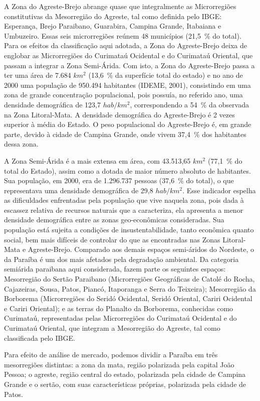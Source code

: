 A Zona do Agreste-Brejo abrange quase que integralmente as Microrregiões constitutivas da Mesorregião do Agreste, tal como definida pelo IBGE: Esperança, Brejo Paraibano, Guarabira, Campina Grande, Itabaiana e Umbuzeiro. Essas seis microrregiões reúnem 48 municípios (21,5~\% do total). Para os efeitos da classificação aqui adotada, a Zona do Agreste-Brejo deixa de englobar as Microrregiões do Curimataú Ocidental e do Curimataú Oriental, que passam a integrar a Zona Semi-Árida. Com isto, a Zona do Agreste-Brejo passa a ter uma área de 7.684 $km^2$ (13,6~\% da superfície total do estado) e no ano de 2000 uma população de 950.494 habitantes (IDEME, 2001), consistindo em uma zona de grande concentração populacional, pois possuía, no referido ano, uma densidade demográfica de 123,7 $hab/km^2$, correspondendo a 54~\% da observada na Zona Litoral-Mata. A densidade demográfica do Agreste-Brejo é 2 vezes superior à média do Estado. O peso populacional do Agreste-Brejo é, em grande parte, devido à cidade de Campina Grande, onde vivem 37,4~\% dos habitantes dessa zona.

A Zona Semi-Árida é a mais extensa em área, com 43.513,65 $km^2$ (77,1~\% do total do Estado), assim como a dotada de maior número absoluto de habitantes. Sua população, em 2000, era de 1.296.737 pessoas (37,6~\% do total), o que representava uma densidade demográfica de 29,8 $hab/km^2$. Esse indicador espelha as dificuldades enfrentadas pela população que vive naquela zona, pois dada à escassez relativa de recursos naturais que a caracteriza, ela apresenta a menor densidade demográfica entre as zonas geo-econômicas consideradas. Sua população está sujeita a condições de insustentabilidade, tanto econômica quanto social, bem mais difíceis de controlar do que as encontradas nas Zonas Litoral-Mata e Agreste-Brejo. Comparado aos demais espaços semi-áridos do Nordeste, o da Paraíba é um dos mais afetados pela degradação ambiental. Da categoria semiárida paraibana aqui considerada, fazem parte os seguintes espaços: Mesorregião do Sertão Paraibano (Microrregiões Geográficas de Catolé do Rocha, Cajazeiras, Sousa, Patos, Piancó, Itaporanga e Serra do Teixeira); Mesorregião da Borborema (Microrregiões do Seridó Ocidental, Seridó Oriental, Cariri Ocidental e Cariri Oriental); e as terras do Planalto da Borborema, conhecidas como Curimataú, representadas pelas Microrregiões do Curimataú Ocidental e do Curimataú Oriental, que integram a Mesorregião do Agreste, tal como classificada pelo IBGE.

Para efeito de análise de mercado, podemos dividir a Paraíba em três mesorregiões distintas: a zona da mata, região polarizada pela capital João Pessoa; o agreste, região central do estado, polarizada pela cidade de Campina Grande e o sertão, com suas características próprias, polarizada pela cidade de Patos.

